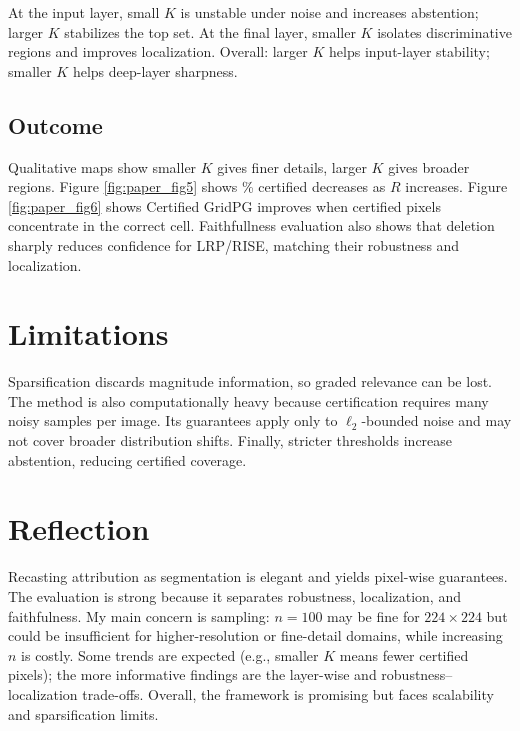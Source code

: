 \documentclass[11pt]{article}
\begin{document}
At the input layer, small $K$ is unstable under noise and increases abstention; larger $K$ stabilizes the top set. At the final layer, smaller $K$ isolates discriminative regions and improves localization. Overall: larger $K$ helps input-layer stability; smaller $K$ helps deep-layer sharpness.

\subsection{Outcome}
Qualitative maps show smaller $K$ gives finer details, larger $K$ gives broader regions. Figure \ref{fig:paper_fig5} shows \% certified decreases as $R$ increases. Figure \ref{fig:paper_fig6} shows Certified GridPG improves when certified pixels concentrate in the correct cell. Faithfullness evaluation also shows that deletion sharply reduces confidence for LRP/RISE, matching their robustness and localization.



\section{Limitations}
Sparsification discards magnitude information, so graded relevance can be lost. The method is also computationally heavy because certification requires many noisy samples per image. Its guarantees apply only to $\ell_2$-bounded noise and may not cover broader distribution shifts. Finally, stricter thresholds increase abstention, reducing certified coverage.

\section{Reflection}
Recasting attribution as segmentation is elegant and yields pixel-wise guarantees. The evaluation is strong because it separates robustness, localization, and faithfulness. My main concern is sampling: $n=100$ may be fine for $224\times224$ but could be insufficient for higher-resolution or fine-detail domains, while increasing $n$ is costly. Some trends are expected (e.g., smaller $K$ means fewer certified pixels); the more informative findings are the layer-wise and robustness--localization trade-offs. Overall, the framework is promising but faces scalability and sparsification limits.




\end{document}
